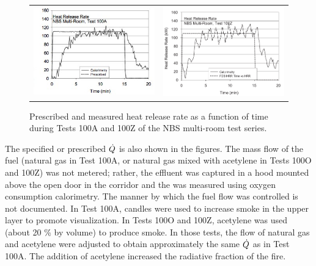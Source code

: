 \begin{figure}[\figoptions{t}]
\begin{center}
\begin{tabular}{cc}
\includegraphics[width=3.0in]{FIGURES/NBS/NBS_HRR_100A} & \includegraphics[width=3.0in]{FIGURES/NBS/NBS_HRR_100Z}\\
\end{tabular}
\end{center}
\caption{Prescribed and measured heat release rate as a function of time during Tests 100A and 100Z of the NBS multi-room test series.}
 \label{fig:NBS_HRR}
\end{figure}

The specified or prescribed  $\dot{Q}$ is also shown in the figures.   The mass flow of the fuel (natural gas in Test 100A, or natural gas mixed with acetylene in Tests 100O and 100Z) was not metered; rather, the effluent was captured in a hood mounted above the open door in the corridor and the   was measured using oxygen consumption calorimetry.  The manner by which the fuel flow was controlled is not documented.  In Test 100A, candles were used to increase smoke in the upper layer to promote visualization. In Tests 100O and 100Z, acetylene was used (about 20 \% by volume) to produce smoke.  In those tests, the flow of natural gas and acetylene were adjusted to obtain approximately the same $\dot{Q}$  as in Test 100A.  The addition of acetylene increased the radiative fraction of the fire. 

